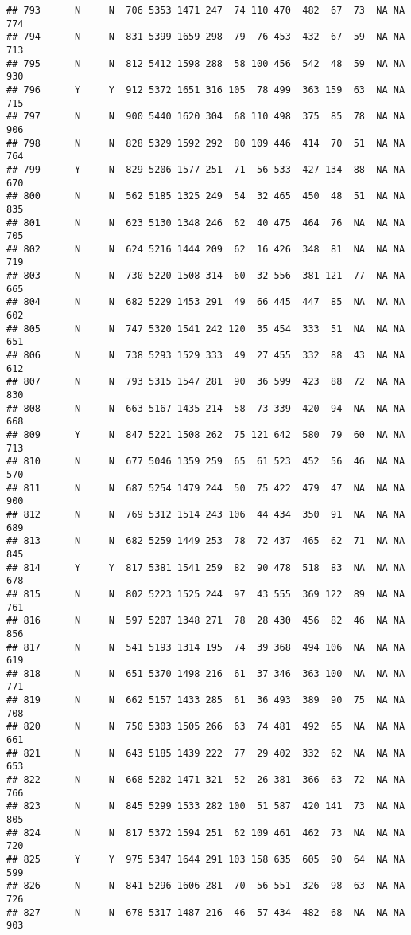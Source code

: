 \documentclass[]{article}
\begin{document}
\begin{verbatim}
## 793      N     N  706 5353 1471 247  74 110 470  482  67  73  NA NA  774
## 794      N     N  831 5399 1659 298  79  76 453  432  67  59  NA NA  713
## 795      N     N  812 5412 1598 288  58 100 456  542  48  59  NA NA  930
## 796      Y     Y  912 5372 1651 316 105  78 499  363 159  63  NA NA  715
## 797      N     N  900 5440 1620 304  68 110 498  375  85  78  NA NA  906
## 798      N     N  828 5329 1592 292  80 109 446  414  70  51  NA NA  764
## 799      Y     N  829 5206 1577 251  71  56 533  427 134  88  NA NA  670
## 800      N     N  562 5185 1325 249  54  32 465  450  48  51  NA NA  835
## 801      N     N  623 5130 1348 246  62  40 475  464  76  NA  NA NA  705
## 802      N     N  624 5216 1444 209  62  16 426  348  81  NA  NA NA  719
## 803      N     N  730 5220 1508 314  60  32 556  381 121  77  NA NA  665
## 804      N     N  682 5229 1453 291  49  66 445  447  85  NA  NA NA  602
## 805      N     N  747 5320 1541 242 120  35 454  333  51  NA  NA NA  651
## 806      N     N  738 5293 1529 333  49  27 455  332  88  43  NA NA  612
## 807      N     N  793 5315 1547 281  90  36 599  423  88  72  NA NA  830
## 808      N     N  663 5167 1435 214  58  73 339  420  94  NA  NA NA  668
## 809      Y     N  847 5221 1508 262  75 121 642  580  79  60  NA NA  713
## 810      N     N  677 5046 1359 259  65  61 523  452  56  46  NA NA  570
## 811      N     N  687 5254 1479 244  50  75 422  479  47  NA  NA NA  900
## 812      N     N  769 5312 1514 243 106  44 434  350  91  NA  NA NA  689
## 813      N     N  682 5259 1449 253  78  72 437  465  62  71  NA NA  845
## 814      Y     Y  817 5381 1541 259  82  90 478  518  83  NA  NA NA  678
## 815      N     N  802 5223 1525 244  97  43 555  369 122  89  NA NA  761
## 816      N     N  597 5207 1348 271  78  28 430  456  82  46  NA NA  856
## 817      N     N  541 5193 1314 195  74  39 368  494 106  NA  NA NA  619
## 818      N     N  651 5370 1498 216  61  37 346  363 100  NA  NA NA  771
## 819      N     N  662 5157 1433 285  61  36 493  389  90  75  NA NA  708
## 820      N     N  750 5303 1505 266  63  74 481  492  65  NA  NA NA  661
## 821      N     N  643 5185 1439 222  77  29 402  332  62  NA  NA NA  653
## 822      N     N  668 5202 1471 321  52  26 381  366  63  72  NA NA  766
## 823      N     N  845 5299 1533 282 100  51 587  420 141  73  NA NA  805
## 824      N     N  817 5372 1594 251  62 109 461  462  73  NA  NA NA  720
## 825      Y     Y  975 5347 1644 291 103 158 635  605  90  64  NA NA  599
## 826      N     N  841 5296 1606 281  70  56 551  326  98  63  NA NA  726
## 827      N     N  678 5317 1487 216  46  57 434  482  68  NA  NA NA  903

\end{verbatim}
\end{document}
